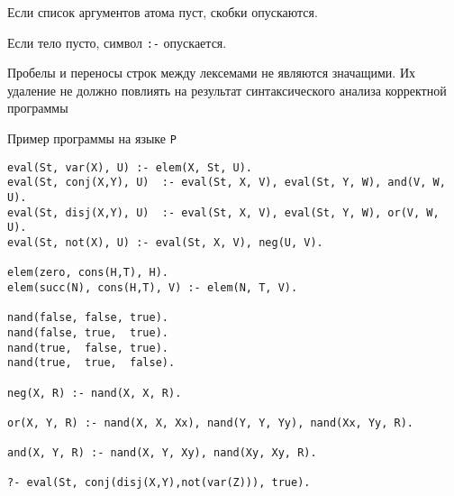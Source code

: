 \documentclass[12pt]{article}
\begin{document}
Если список аргументов атома пуст, скобки опускаются. 

Если тело пусто, символ \verb!:-! опускается. 

Пробелы и переносы строк между лексемами не являются значащими. Их удаление не должно повлиять на результат синтаксического анализа корректной программы

\begin{center}
    \Large{Пример программы на языке \verb!P!}
\end{center}

\begin{verbatim}
eval(St, var(X), U) :- elem(X, St, U).
eval(St, conj(X,Y), U)  :- eval(St, X, V), eval(St, Y, W), and(V, W, U).
eval(St, disj(X,Y), U)  :- eval(St, X, V), eval(St, Y, W), or(V, W, U).
eval(St, not(X), U) :- eval(St, X, V), neg(U, V).

elem(zero, cons(H,T), H).
elem(succ(N), cons(H,T), V) :- elem(N, T, V).

nand(false, false, true).
nand(false, true,  true).
nand(true,  false, true).
nand(true,  true,  false).

neg(X, R) :- nand(X, X, R).

or(X, Y, R) :- nand(X, X, Xx), nand(Y, Y, Yy), nand(Xx, Yy, R).

and(X, Y, R) :- nand(X, Y, Xy), nand(Xy, Xy, R).

?- eval(St, conj(disj(X,Y),not(var(Z))), true).
\end{verbatim}
\end{document}
